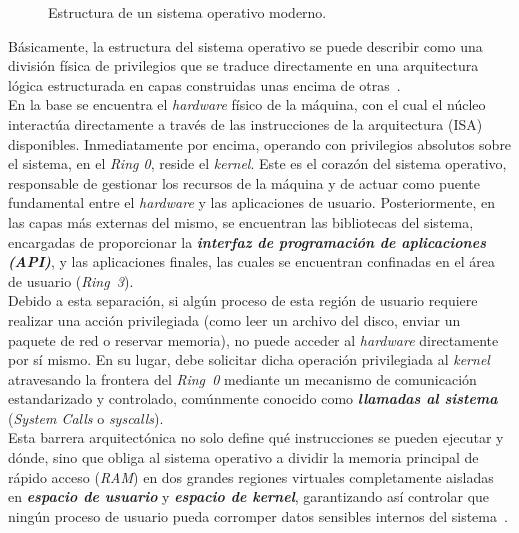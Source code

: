 \begin{figure}[h!]
  \centering
  \scalebox{1.1}{}
  \caption{Estructura de un sistema operativo moderno.}
  \label{fig:os_structure}
\end{figure}

Básicamente, la estructura del sistema operativo se puede describir como una división física de privilegios que se traduce directamente en una arquitectura lógica estructurada en capas construidas unas encima de otras~\cite{librossoo}.\\

En la base se encuentra el \textit{hardware} físico de la máquina, con el cual el núcleo interactúa directamente a través de las instrucciones de la arquitectura (ISA) disponibles.
Inmediatamente por encima, operando con privilegios absolutos sobre el sistema, en el \textit{Ring 0}, reside el \textit{kernel}. Este es el corazón del sistema operativo, responsable de gestionar los recursos de la máquina y de actuar como puente fundamental entre el \textit{hardware} y las aplicaciones de usuario.
Posteriormente, en las capas más externas del mismo, se encuentran las bibliotecas del sistema, encargadas de proporcionar la \textbf{\textit{interfaz de programación de aplicaciones (API)}}, y las aplicaciones finales, las cuales se encuentran confinadas en el área de usuario (\textit{Ring~3}).\\

Debido a esta separación, si algún proceso de esta región de usuario requiere realizar una acción privilegiada (como leer un archivo del disco, enviar un paquete de red o reservar memoria), no puede acceder al \textit{hardware} directamente por sí mismo.
En su lugar, debe solicitar dicha operación privilegiada al \textit{kernel} atravesando la frontera del \textit{Ring~0} mediante un mecanismo de comunicación estandarizado y controlado, comúnmente conocido como \textbf{\textit{llamadas al sistema}} (\textit{System Calls} o \textit{syscalls}).\\

Esta barrera arquitectónica no solo define qué instrucciones se pueden ejecutar y dónde, sino que obliga al sistema operativo a dividir la memoria principal de rápido acceso (\textit{RAM}) en dos grandes regiones virtuales completamente aisladas en \textbf{\textit{espacio de usuario}} y \textbf{\textit{espacio de kernel}},
garantizando así controlar que ningún proceso de usuario pueda corromper datos sensibles internos del sistema~\cite{love_linux, librossoo}.

